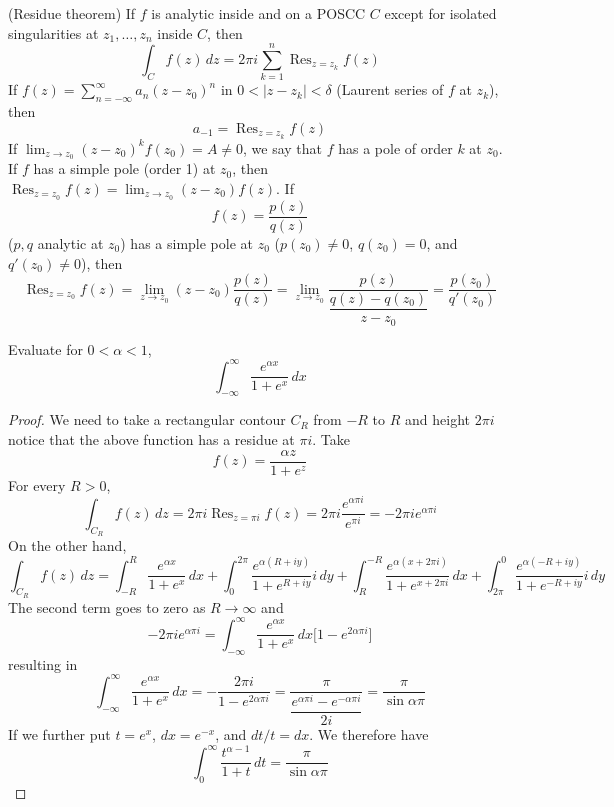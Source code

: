 \begin{thm}
(Residue theorem) If $f$ is analytic inside and on a POSCC $C$ except for isolated singularities at $z_1,\ldots,z_{n}$ inside $C$, then
\[\int _{C}f(z)\,dz=2\pi i\sum ^{n}_{k=1}\mathop{\mathrm{Res}}_{z=z_{k}}f(z)\]
If $f(z)=\sum ^{\infty }_{n=-\infty }a_{n}(z-z_0)^{n}$ in $0<|z-z_{k}|<\delta $ (Laurent series of $f$ at $z_k$), then 
\[a_{-1}=\mathop{\mathrm{Res}}_{z=z_{k}}f(z)\]
If $\lim _{z\rightarrow z_0}(z-z_0)^{k}f(z_0)=A\ne 0$, we say that $f$ has a pole of order $k$ at $z_0$. If $f$ has a simple pole (order 1) at $z_0$, then $\mathop{\mathrm{Res}}_{z=z_0}f(z)=\lim _{z\rightarrow z_0}(z-z_0)f(z)$. If 
\[f(z)=\dfrac{p(z)}{q(z)}\]
($p,q$ analytic at $z_0$) has a simple pole at $z_0$ ($p(z_0)\ne 0 $, $q(z_0)=0$, and $q'(z_0)\ne 0$), then
\[\mathop{\mathrm{Res}}_{z=z_0}f(z)=\lim _{z\rightarrow z_0}(z-z_0)\dfrac{p(z)}{q(z)}=\lim _{z\rightarrow z_0}\dfrac{p(z)}{\dfrac{q(z)-q(z_0)}{z-z_0}}=\dfrac{p(z_0)}{q'(z_0)}\]
\end{thm}
\vspace{2ex}
\begin{ex}
Evaluate for $0<\alpha <1$,
\[\int ^{\infty }_{-\infty }\dfrac{e^{\alpha x}}{1+e^{x}}\,dx\]
\end{ex}
\vspace{2ex}
\begin{proof}
We need to take a rectangular contour $C_{R}$ from $-R$ to $R$ and height $2\pi i$ notice that the above function has a residue at $\pi i$. Take 
\[f(z)=\dfrac{\alpha z}{1+e^{z}}\]
For every $R>0$,
\[\int _{C_{R}}f(z)\,dz=2\pi i\mathop{\mathrm{Res}}_{z=\pi i}f(z)=2\pi i\dfrac{e^{\alpha \pi i}}{e^{\pi i}}=-2\pi ie^{\alpha \pi i}\]
On the other hand,
\[\int _{C_{R}}f(z)\,dz=\int ^{R}_{-R}\dfrac{e^{\alpha x}}{1+e^{x}}\,dx+\int ^{2\pi }_{0}\dfrac{e^{\alpha (R+iy)}}{1+e^{R+iy}}i\,dy+\int ^{-R}_{R}\dfrac{e^{\alpha (x+2\pi i)}}{1+e^{x+2\pi i}}\,dx+\int ^{0}_{2\pi }\dfrac{e^{\alpha (-R+iy)}}{1+e^{-R+iy}}i\,dy\]
The second term goes to zero as $R\rightarrow \infty $ and 
\[-2\pi ie^{\alpha \pi i}=\int ^{\infty }_{-\infty }\dfrac{e^{\alpha x}}{1+e^{x}}\,dx\Big[1-e^{2\alpha \pi i}\Big]\]
resulting in
\[\int ^{\infty }_{-\infty }\dfrac{e^{\alpha x}}{1+e^{x}}\,dx=-\dfrac{2\pi i}{1-e^{2\alpha \pi i}}=\dfrac{\pi }{\dfrac{e^{\alpha \pi i}-e^{-\alpha \pi i}}{2i}}=\dfrac{\pi }{\sin \alpha \pi }\]
If we further put $t=e^{x}$, $dx=e^{-x}$,  and $dt/t=dx$. We therefore have
\[\int ^{\infty }_{0}\dfrac{t^{\alpha -1}}{1+t}\,dt=\dfrac{\pi }{\sin \alpha \pi }\]

\end{proof}
\vspace{2ex}

